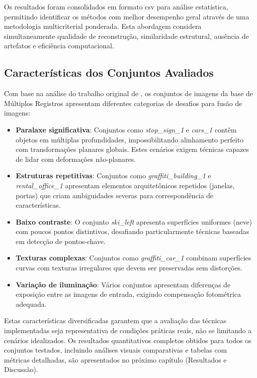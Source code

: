 Os resultados foram consolidados em formato \gls{csv} para análise estatística, permitindo identificar os métodos com melhor desempenho geral através de uma metodologia multicriterial ponderada. Esta abordagem considera simultaneamente qualidade de reconstrução, similaridade estrutural, ausência de artefatos e eficiência computacional.

\subsection{Características dos Conjuntos Avaliados}

Com base na análise do trabalho original de \cite{zhang2018robust}, os conjuntos de imagens da base de Múltiplos Registros apresentam diferentes categorias de desafios para fusão de imagens:

\begin{itemize}
    \item \textbf{Paralaxe significativa}: Conjuntos como \textit{stop\_sign\_1} e \textit{cars\_1} contêm objetos em múltiplas profundidades, impossibilitando alinhamento perfeito com transformações planares globais. Estes cenários exigem técnicas capazes de lidar com deformações não-planares.

    \item \textbf{Estruturas repetitivas}: Conjuntos como \textit{graffiti\_building\_1} e \textit{rental\_office\_1} apresentam elementos arquitetônicos repetidos (janelas, portas) que criam ambiguidades severas para correspondência de características.

    \item \textbf{Baixo contraste}: O conjunto \textit{ski\_left} apresenta superfícies uniformes (neve) com poucos pontos distintivos, desafiando particularmente técnicas baseadas em detecção de pontos-chave.

    \item \textbf{Texturas complexas}: Conjuntos como \textit{graffiti\_car\_1} combinam superfícies curvas com texturas irregulares que devem ser preservadas sem distorções.

    \item \textbf{Variação de iluminação}: Vários conjuntos apresentam diferenças de exposição entre as imagens de entrada, exigindo compensação fotométrica adequada.
\end{itemize}

Estas características diversificadas garantem que a avaliação das técnicas implementadas seja representativa de condições práticas reais, não se limitando a cenários idealizados. Os resultados quantitativos completos obtidos para todos os conjuntos testados, incluindo análises visuais comparativas e tabelas com métricas detalhadas, são apresentados no próximo capítulo (Resultados e Discussão).

